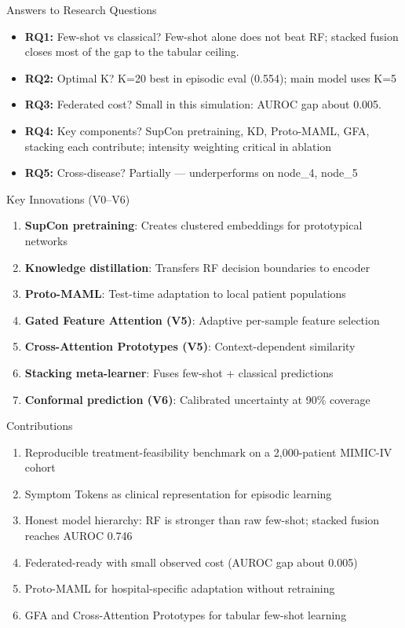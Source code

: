 \documentclass[aspectratio=169,11pt]{beamer}
\begin{document}
\begin{frame}{Answers to Research Questions}
\begin{itemize}
\item \textbf{RQ1:} Few-shot vs classical? Few-shot alone does not beat RF; stacked fusion closes most of the gap to the tabular ceiling.
\item \textbf{RQ2:} Optimal K? K=20 best in episodic eval (0.554); main model uses K=5
\item \textbf{RQ3:} Federated cost? Small in this simulation: AUROC gap about 0.005.
\item \textbf{RQ4:} Key components? SupCon pretraining, KD, Proto-MAML, GFA, stacking each contribute; intensity weighting critical in ablation
\item \textbf{RQ5:} Cross-disease? Partially --- underperforms on node\_4, node\_5
\end{itemize}
\end{frame}

\begin{frame}{Key Innovations (V0--V6)}
\begin{enumerate}
\item \textbf{SupCon pretraining}: Creates clustered embeddings for prototypical networks
\item \textbf{Knowledge distillation}: Transfers RF decision boundaries to encoder
\item \textbf{Proto-MAML}: Test-time adaptation to local patient populations
\item \textbf{Gated Feature Attention (V5)}: Adaptive per-sample feature selection
\item \textbf{Cross-Attention Prototypes (V5)}: Context-dependent similarity
\item \textbf{Stacking meta-learner}: Fuses few-shot + classical predictions
\item \textbf{Conformal prediction (V6)}: Calibrated uncertainty at 90\% coverage
\end{enumerate}
\end{frame}

\begin{frame}{Contributions}
\begin{enumerate}
\item Reproducible treatment-feasibility benchmark on a 2,000-patient MIMIC-IV cohort
\item Symptom Tokens as clinical representation for episodic learning
\item Honest model hierarchy: RF is stronger than raw few-shot; stacked fusion reaches AUROC 0.746
\item Federated-ready with small observed cost (AUROC gap about 0.005)
\item Proto-MAML for hospital-specific adaptation without retraining
\item GFA and Cross-Attention Prototypes for tabular few-shot learning
\end{enumerate}
\end{frame}
\end{document}
